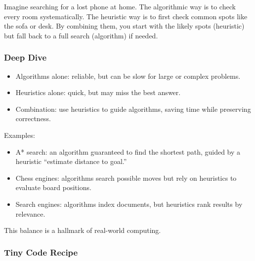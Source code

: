 \documentclass[
  letterpaper,
  DIV=11,
  numbers=noendperiod]{scrreprt}
\providecommand{\tightlist}{%
  \setlength{\itemsep}{0pt}\setlength{\parskip}{0pt}}
\begin{document}
Imagine searching for a lost phone at home. The algorithmic way is to
check every room systematically. The heuristic way is to first check
common spots like the sofa or desk. By combining them, you start with
the likely spots (heuristic) but fall back to a full search (algorithm)
if needed.

\subsubsection{Deep Dive}\label{deep-dive-56}

\begin{itemize}
\tightlist
\item
  Algorithms alone: reliable, but can be slow for large or complex
  problems.
\item
  Heuristics alone: quick, but may miss the best answer.
\item
  Combination: use heuristics to guide algorithms, saving time while
  preserving correctness.
\end{itemize}

Examples:

\begin{itemize}
\tightlist
\item
  A* search: an algorithm guaranteed to find the shortest path, guided
  by a heuristic ``estimate distance to goal.''
\item
  Chess engines: algorithms search possible moves but rely on heuristics
  to evaluate board positions.
\item
  Search engines: algorithms index documents, but heuristics rank
  results by relevance.
\end{itemize}

This balance is a hallmark of real-world computing.

\subsubsection{Tiny Code Recipe}\label{tiny-code-recipe-84}
\end{document}
